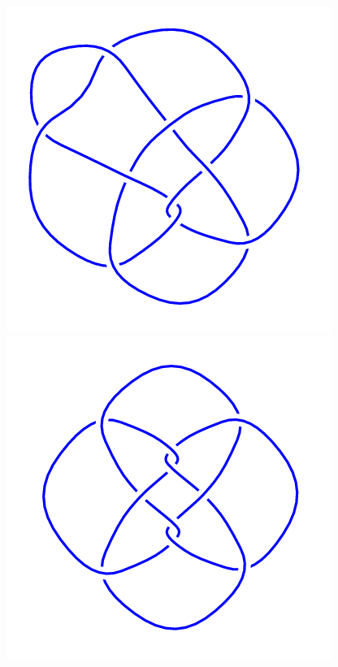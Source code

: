 \begin{figure}[H]
\begin{minipage}[b]{.18\linewidth}
	\end{minipage}
	\begin{minipage}[b]{.18\linewidth}
		\centering
		\includegraphics[width=\linewidth]{../data/10_119.png}
	\end{minipage}
	\begin{minipage}[b]{.18\linewidth}
		\centering
		\includegraphics[width=\linewidth]{../data/10_120.png}

\end{minipage}
\end{figure}
